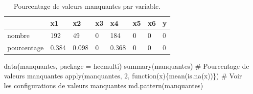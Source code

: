 \documentclass[
  11pt,
  letterpaper,
]{book}
\newenvironment{Shaded}{\begin{snugshade}}{\end{snugshade}}
\newcommand{\AttributeTok}[1]{\textcolor[rgb]{0.40,0.45,0.13}{#1}}
\newcommand{\CommentTok}[1]{\textcolor[rgb]{0.37,0.37,0.37}{#1}}
\newcommand{\ControlFlowTok}[1]{\textcolor[rgb]{0.00,0.23,0.31}{#1}}
\newcommand{\DecValTok}[1]{\textcolor[rgb]{0.68,0.00,0.00}{#1}}
\newcommand{\FunctionTok}[1]{\textcolor[rgb]{0.28,0.35,0.67}{#1}}
\newcommand{\NormalTok}[1]{\textcolor[rgb]{0.00,0.23,0.31}{#1}}
\newcommand{\StringTok}[1]{\textcolor[rgb]{0.13,0.47,0.30}{#1}}
\theoremstyle{definition}
\theoremstyle{remark}
\begin{document}
\hypertarget{tbl-manquantes-univ}{}
\begin{table}
\caption{\label{tbl-manquantes-univ}Pourcentage de valeurs manquantes par variable. }\tabularnewline

\centering
\begin{tabular}{llllllll}
\toprule
  & x1 & x2 & x3 & x4 & x5 & x6 & y\\
\midrule
nombre & 192 & 49 & 0 & 184 & 0 & 0 & 0\\
pourcentage & 0.384 & 0.098 & 0 & 0.368 & 0 & 0 & 0\\
\bottomrule
\end{tabular}
\end{table}

\begin{Shaded}
\begin{Highlighting}[]
\FunctionTok{data}\NormalTok{(manquantes, }\AttributeTok{package =} \StringTok{\textquotesingle{}hecmulti\textquotesingle{}}\NormalTok{)}
\FunctionTok{summary}\NormalTok{(manquantes)}
\CommentTok{\# Pourcentage de valeurs manquantes}
\FunctionTok{apply}\NormalTok{(manquantes, }\DecValTok{2}\NormalTok{, }\ControlFlowTok{function}\NormalTok{(x)\{}\FunctionTok{mean}\NormalTok{(}\FunctionTok{is.na}\NormalTok{(x))\})}
\CommentTok{\# Voir les configurations de valeurs manquantes}
\FunctionTok{md.pattern}\NormalTok{(manquantes)}
\end{Highlighting}
\end{Shaded}
\end{document}

